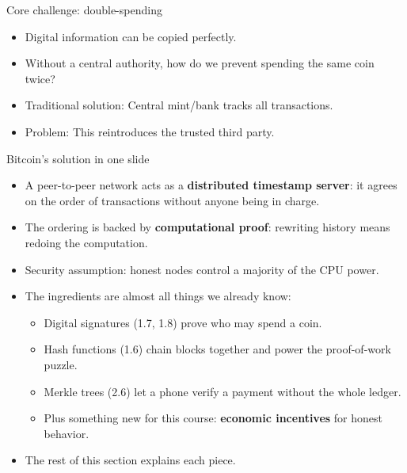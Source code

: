 \ifdefined\PRESENTATION\else\PassOptionsToClass{handout}{beamer}\fi\documentclass[aspectratio=169, lualatex]{beamer}
\begin{document}
\begin{frame}{Core challenge: double-spending}
	\begin{itemize}
		\item Digital information can be copied perfectly.
		\item Without a central authority, how do we prevent spending the same coin twice?
		\item Traditional solution: Central mint/bank tracks all transactions.
		\item Problem: This reintroduces the trusted third party.
	\end{itemize}
\end{frame}

\begin{frame}{Bitcoin's solution in one slide}
	\begin{itemize}
		\item A peer-to-peer network acts as a \textbf{distributed timestamp server}: it agrees on the order of transactions without anyone being in charge.
		\item The ordering is backed by \textbf{computational proof}: rewriting history means redoing the computation.
		\item Security assumption: honest nodes control a majority of the CPU power.
		\item The ingredients are almost all things we already know:
		      \begin{itemize}
			      \item Digital signatures (1.7, 1.8) prove who may spend a coin.
			      \item Hash functions (1.6) chain blocks together and power the proof-of-work puzzle.
			      \item Merkle trees (2.6) let a phone verify a payment without the whole ledger.
			      \item Plus something new for this course: \textbf{economic incentives} for honest behavior.
		      \end{itemize}
		\item The rest of this section explains each piece.
	\end{itemize}
\end{frame}
\end{document}
